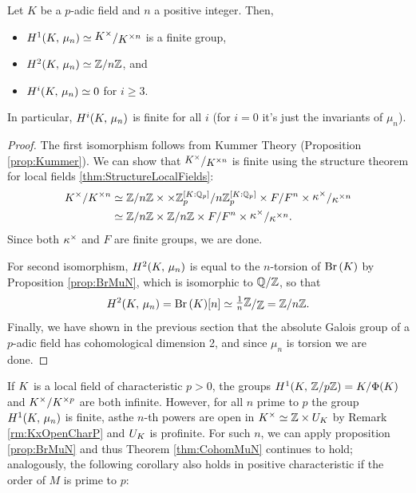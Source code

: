 \documentclass[a4paper, oneside]{memoir}
\begin{document}
\begin{theorem}\label{thm:CohomMuN}
	Let $K$ be a $p$-adic field and $n$ a positive integer.
	Then,
	\begin{itemize}
		\item $\H{1}{\K}{\mu_n} \simeq \ssfrac{\K^\times}{\K^{\times n}}$ is a finite group,
		\item $H^{2}( K, \, \mu_n ) \simeq \mathbb{Z}/n\mathbb{Z}$, and
		\item $H^{i}( K, \, \mu_n ) \simeq 0$ for $i\geq 3$.
	\end{itemize}
	In particular, $H^{i}( K, \, \mu_n )$ is finite for all $i$ (for $i=0$ it's just the invariants of $\mu_n$).
\end{theorem}
\begin{proof}
	The first isomorphism follows from Kummer Theory (Proposition \ref{prop:Kummer}). We can show that $\sfrac{\K^\times}{\K^{\times n}}$ is finite using the structure theorem for local fields \ref{thm:StructureLocalFields}:
	\begin{align*}
		\K^\times/\K^{\times n} & \simeq \Zn \times  \times \Zp^{[\K:\Qp]}/n \Zp^{[\K:\Qp]} \times F/F^n \times  \ssfrac{\k^\times}{\k^{\times n}} \\
		                        & \simeq \Zn \times  \Zn \times F/F^n  \times \ssfrac{\k^\times}{\k^{\times n}}.
	\end{align*}
	Since both $\kappa^\times$ and $F$ are finite groups, we are done.

	For second isomorphism, $H^{2}( K, \, \mu_n )$ is equal to the $n$-torsion of $\operatorname{Br}{(K)}$ by Proposition \ref{prop:BrMuN}, which is isomorphic to $\mathbb{Q}/\mathbb{Z}$, so that
	\[
		\H{2}{\K}{\mu_n} = \Br{\K}[n] \simeq \ssfrac{\frac{1}{n}\Z}{\Z} = \Z/n\Z.
	\]
	Finally, we have shown in the previous section that the absolute Galois group of a $p$-adic field has cohomological dimension 2, and since $\mu_n$ is torsion we are done.
\end{proof}

\begin{remark}\label{rm:H1CharP}
	If $K$ is a local field of characteristic $p>0$, the groups $H^{1}( K, \, \mathbb{Z}/p\mathbb{Z} )=K/\Phi(K)$ and $K^\times/K^{\times p}$ are both infinite. However, for all $n$ prime to $p$ the group $H^{1}( K, \, \mu_n )$ is finite, asthe $n$-th powers are open in $K^\times\simeq\mathbb{Z}\times U_K$ by Remark \ref{rm:KxOpenCharP} and $U_K$ is profinite. For such $n$, we can apply proposition \ref{prop:BrMuN} and thus Theorem \ref{thm:CohomMuN} continues to hold; analogously, the following corollary also holds in positive characteristic if the order of $M$ is prime to $p$:
\end{remark}
\end{document}
